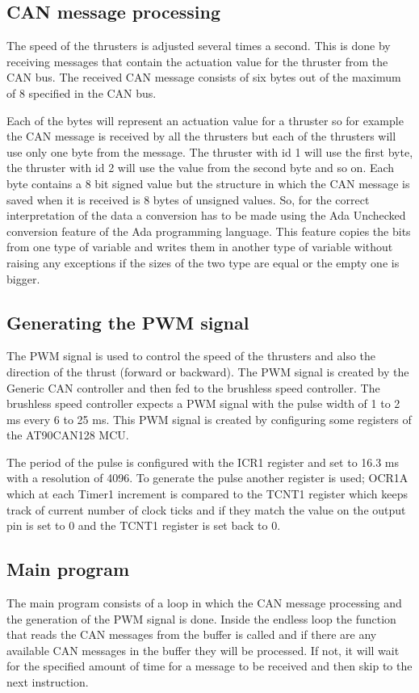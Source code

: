 \subsection{CAN message processing}
The speed of the thrusters is adjusted several times a second. This is done by receiving messages that contain the actuation value for the thruster from the CAN bus. The received CAN message consists of six bytes out of the maximum of 8 specified in the CAN bus. 

Each of the bytes will represent an actuation value for a thruster so for example the CAN message is received by all the thrusters but each of the thrusters will use only one byte from the message. The thruster with id 1 will use the first byte, the thruster with id 2 will use the value from the second byte and so on. Each byte contains a 8 bit signed value but the structure in which the CAN message is saved when it is received is 8 bytes of unsigned values. So, for the correct interpretation of the data a conversion has to be made using the Ada Unchecked conversion feature of the Ada programming language. This feature copies the bits from one type of variable and writes them in another type of variable without raising any exceptions if the sizes of the two type are equal or the empty one is bigger.  
\subsection{Generating the PWM signal}
The PWM signal is used to control the speed of the thrusters and also the direction of the thrust (forward or backward). The PWM signal is created by the Generic CAN controller and then fed to the brushless speed controller. The brushless speed controller expects a PWM signal with the pulse width of 1 to 2 ms every 6 to 25 ms. This PWM signal is created by configuring some registers of the AT90CAN128 MCU.

 The period of the pulse is configured with the ICR1 register and set to 16.3 ms with a resolution of 4096. To generate the pulse another register is used; OCR1A which at each Timer1 increment is compared to the TCNT1 register which keeps track of current number of clock ticks and if they match the value on the output pin is set to 0 and the TCNT1 register is set back to 0. 

\subsection{Main program}
The main program consists of a loop in which the CAN message processing and the generation of the PWM signal is done. Inside the endless loop the function that reads the CAN messages from the buffer is called and if there are any available CAN messages in the buffer they will be processed. If not, it will wait for the specified amount of time for a message to be received and then skip to the next instruction.

 